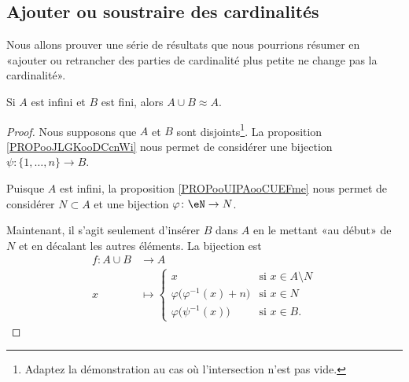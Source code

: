 \subsection{Ajouter ou soustraire des cardinalités}

Nous allons prouver une série de résultats que nous pourrions résumer en  «ajouter ou retrancher des parties de cardinalité plus petite ne change pas la cardinalité».

\begin{lemma}        \label{LEMooUFCAooSyZtZj}
	Si \( A\) est infini et \( B\) est fini, alors \( A\cup B\approx A\).
\end{lemma}

\begin{proof}
	Nous supposons que \( A\) et \( B\) sont disjoints\footnote{Adaptez la démonstration au cas où l'intersection n'est pas vide.}. La proposition \ref{PROPooJLGKooDCcnWi} nous permet de considérer une bijection \( \psi\colon \{ 1,\ldots, n \}\to B\).

	Puisque \( A\) est infini, la proposition \ref{PROPooUIPAooCUEFme} nous permet de considérer \( N\subset A\) et une bijection \( \varphi\colon \eN\to N\).

	Maintenant, il s'agit seulement d'insérer \( B\) dans \( A\) en le mettant «au début» de \( N\) et en décalant les autres éléments. La bijection est
	\begin{equation}
		\begin{aligned}
			f\colon A\cup B & \to A                                                                                  \\
			x               & \mapsto \begin{cases}
				                          x                                    & \text{si } x\in A\setminus N \\
				                          \varphi\big( \varphi^{-1}(x)+n \big) & \text{si } x\in N            \\
				                          \varphi\big( \psi^{-1}(x) \big)      & \text{si }x\in B.
			                          \end{cases}
		\end{aligned}
	\end{equation}
\end{proof}

